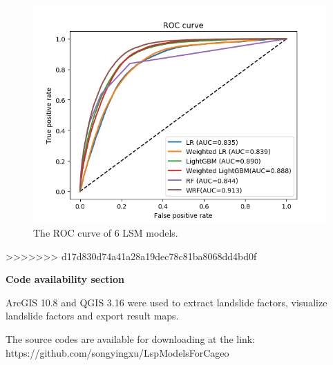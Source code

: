 \documentclass[a4paper,fleqn]{cas-sc}
\begin{document}
\begin{figure}
  \centering
  \includegraphics[width=12 cm]{Definitions/Fig_ROC_All.png}
  \caption{The ROC curve of 6 LSM models.}
  \label{Fig_ROC_All}
\end{figure} 
>>>>>>> d17d830d74a41a28a19dec78c81ba8068dd4bd0f

\newpage

\textbf{Code availability section}

ArcGIS 10.8 and QGIS 3.16 were used to extract landslide factors, visualize landslide factors and export result maps.

The source codes are available for downloading at the link:
https://github.com/songyingxu/LspModelsForCageo



 
\end{document}
